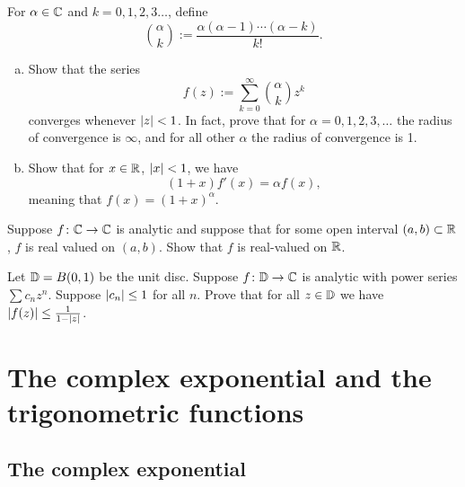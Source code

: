 \begin{exercise}
For $\alpha \in {\mathbb{C}}$ and $k=0,1,2,3\ldots$, define
\begin{equation*}
\binom{\alpha}{k} := \frac{\alpha(\alpha-1)\cdots(\alpha-k)}{k!} .
\end{equation*}
\begin{enumerate}[a)]
\item
Show that the series
\begin{equation*}
f(z) := \sum_{k=0}^\infty \binom{\alpha}{k} z^k
\end{equation*}
converges whenever $\left\lvert {z} \right\rvert < 1$.
In fact, prove that for $\alpha = 0,1,2,3,\ldots$ the radius of
convergence is $\infty$, and for all other $\alpha$
the radius of convergence is 1.
\item
Show that for $x \in {\mathbb{R}}$, $\left\lvert {x} \right\rvert < 1$, we have
\begin{equation*}
(1+x) f'(x) = \alpha f(x) ,
\end{equation*}
meaning that $f(x) = (1+x)^\alpha$.
\end{enumerate}
\end{exercise}

\begin{exercise}
Suppose $f \colon {\mathbb{C}} \to {\mathbb{C}}$ is analytic and suppose that for some
open interval $(a,b) \subset {\mathbb{R}}$, $f$ is real valued on $(a,b)$.  Show
that $f$ is real-valued on ${\mathbb{R}}$.
\end{exercise}

\begin{exercise}
Let ${\mathbb{D}} = B(0,1)$ be the unit disc.  Suppose
$f \colon {\mathbb{D}} \to {\mathbb{C}}$ is analytic with power series
$\sum c_n z^n$.  Suppose $\lvert {c_n} \rvert \leq 1$ for all $n$.  Prove that for
all $z \in {\mathbb{D}}$ we have
$\lvert {f(z)} \rvert \leq \frac{1}{1-\lvert {z} \rvert}$.
\end{exercise}


\sectionnewpage
\section{The complex exponential and the trigonometric functions}
\label{sec:complexexp}


\subsection{The complex exponential}

